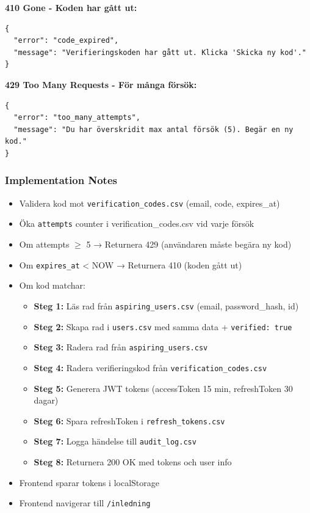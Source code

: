 \documentclass[12pt,a4paper]{article}
\begin{document}
\textbf{410 Gone - Koden har gått ut:}
\begin{lstlisting}
{
  "error": "code_expired",
  "message": "Verifieringskoden har gått ut. Klicka 'Skicka ny kod'."
}
\end{lstlisting}

\textbf{429 Too Many Requests - För många försök:}
\begin{lstlisting}
{
  "error": "too_many_attempts",
  "message": "Du har överskridit max antal försök (5). Begär en ny kod."
}
\end{lstlisting}

\subsubsection{Implementation Notes}
\begin{itemize}[noitemsep]
  \item Validera kod mot \texttt{verification\_codes.csv} (email, code, expires\_at)
  \item Öka \texttt{attempts} counter i verification\_codes.csv vid varje försök
  \item Om attempts $\geq$ 5 → Returnera 429 (användaren måste begära ny kod)
  \item Om \texttt{expires\_at} < NOW → Returnera 410 (koden gått ut)
  \item Om kod matchar:
  \begin{itemize}[noitemsep]
    \item \textbf{Steg 1:} Läs rad från \texttt{aspiring\_users.csv} (email, password\_hash, id)
    \item \textbf{Steg 2:} Skapa rad i \texttt{users.csv} med samma data + \texttt{verified: true}
    \item \textbf{Steg 3:} Radera rad från \texttt{aspiring\_users.csv}
    \item \textbf{Steg 4:} Radera verifieringskod från \texttt{verification\_codes.csv}
    \item \textbf{Steg 5:} Generera JWT tokens (accessToken 15 min, refreshToken 30 dagar)
    \item \textbf{Steg 6:} Spara refreshToken i \texttt{refresh\_tokens.csv}
    \item \textbf{Steg 7:} Logga händelse till \texttt{audit\_log.csv}
    \item \textbf{Steg 8:} Returnera 200 OK med tokens och user info
  \end{itemize}
  \item Frontend sparar tokens i localStorage
  \item Frontend navigerar till \texttt{/inledning}
\end{itemize}
\end{document}
